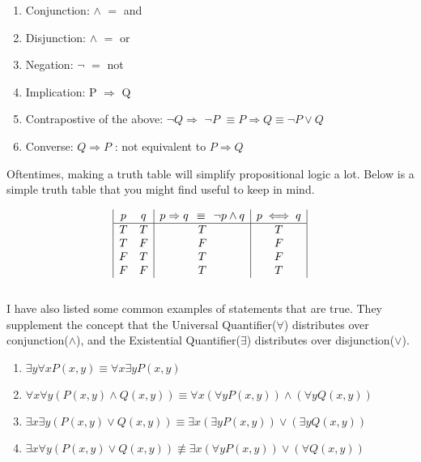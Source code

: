 \documentclass[a4paper]{article}
\begin{document}
\begin{enumerate}
	\item Conjunction: $\land$ $=$ and
	\item Disjunction: $\wedge$  $=$ or
	\item Negation: $\neg$ $=$ not
	\item Implication: P $\Rightarrow$ Q
	\item Contrapostive of the above: $\neg Q \Rightarrow$ $\neg P$ $\equiv P\Rightarrow Q \equiv \neg P \vee Q$ 
	\item Converse: $Q \Rightarrow P$ : not equivalent to $P \Rightarrow Q$ 

	
\end{enumerate}



Oftentimes, making a truth table will simplify propositional logic a lot. Below is a simple truth table that you might find useful to keep in mind.

\begin{displaymath}
\begin{array}{|c c|c|c|}
p & q & p \Rightarrow q \hspace{1ex} \equiv \hspace{1ex} \neg p \wedge q & p \iff q\\ %
\hline %
T & T & T & T\\
T & F & F & F\\
F & T & T & F\\
F & F & T & T\\
\end{array}
\end{displaymath} \\

I have also listed some common examples of statements that are true. They supplement the concept that the Universal Quantifier($\forall$) distributes over conjunction($\land$), and the Existential Quantifier($\exists$) distributes over disjunction($\vee$). 

\begin{enumerate}
	\item $\exists y \forall x P(x,y) \equiv \forall x \exists y P(x,y)$
	\item $\forall x \forall y (P(x,y) \land Q(x,y)) \equiv \forall x (\forall y P(x,y)) \land (\forall y Q(x,y))$
	\item $\exists x \exists y (P(x,y) \vee Q(x,y)) \equiv \exists x (\exists y P(x,y)) \vee (\exists y Q(x,y))$
	\item $\exists x \forall y (P(x,y) \vee Q(x,y)) \not\equiv \exists x (\forall y P (x , y)) \vee (\forall Q(x,y))$

\end{enumerate}
\end{document}
